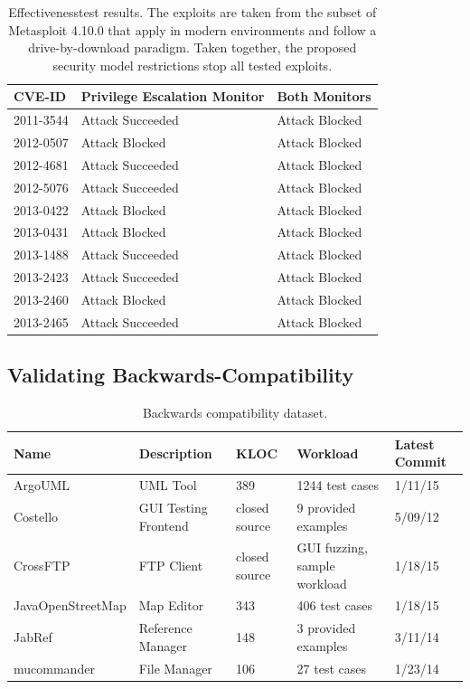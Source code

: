 \documentclass{sig-alternate}
\begin{document}
\begin{table}
\caption{Effectiveness\label{tab:Exploit-experiment-summary} test results.  The
  exploits are taken from the subset of Metasploit 4.10.0 that apply in modern
  environments and follow a drive-by-download paradigm.
  Taken together, the proposed security model restrictions stop all tested exploits.}
\begin{tabular}{l>{\raggedright}p{3cm}l}
\toprule 
\textbf{CVE-ID} & \textbf{Privilege Escalation Monitor} & \textbf{Both Monitors}\tabularnewline
\midrule
2011-3544 & Attack Succeeded  & Attack Blocked \\
2012-0507 & Attack Blocked & Attack Blocked \\
2012-4681 & Attack Succeeded  & Attack Blocked \\
2012-5076 & Attack Succeeded  & Attack Blocked \\
2013-0422 & Attack Blocked & Attack Blocked \\
2013-0431 & Attack Blocked & Attack Blocked \\
2013-1488 & Attack Succeeded  & Attack Blocked \\
2013-2423 & Attack Succeeded  & Attack Blocked \\
2013-2460 & Attack Blocked & Attack Blocked \\
2013-2465 & Attack Succeeded  & Attack Blocked \\
\bottomrule
\end{tabular}
\end{table}

\subsection{Validating Backwards-Compatibility}\label{sec:backcompat}
\begin{table}
\caption{\label{tab:validation-programs}
Backwards compatibility dataset.}
\centering

\begin{tabular}{lllll}
\toprule 
\textbf{Name} & \textbf{Description} & \textbf{KLOC} & \textbf{Workload} & \textbf{Latest Commit}\tabularnewline
\midrule
ArgoUML & UML Tool & 389 & 1244 test cases & 1/11/15 \tabularnewline
Costello & GUI Testing Frontend & closed source & 9 provided examples & 5/09/12 \tabularnewline
CrossFTP & FTP Client & closed source & GUI fuzzing, sample workload & 1/18/15 \tabularnewline
JavaOpenStreetMap & Map Editor & 343 & 406 test cases & 1/18/15 \tabularnewline
JabRef & Reference Manager & 148 & 3 provided examples & 3/11/14 \tabularnewline 
mucommander & File Manager & 106 & 27 test cases & 1/23/14 \tabularnewline
\bottomrule
\end{tabular}
\vspace{-0.5cm}
\end{table}
\end{document}
